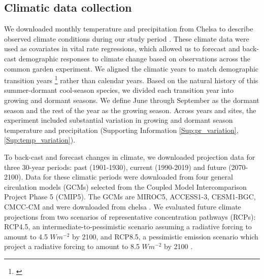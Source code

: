 \documentclass[12pt]{article}
\newcommand{\tom}[2]{{\color{red}{#1}}\footnote{\textit{\color{red}{#2}}}}
\begin{document}
\subsection*{Climatic data collection}
We downloaded monthly temperature and precipitation from Chelsa to describe observed climate conditions during our study period \citep{karger2017climatologies}.
These climate data were used as covariates in vital rate regressions, which allowed us to forecast and back-cast demographic responses to climate change based on observations across the common garden experiment. 
We aligned the climatic years to match demographic transition years \tom{(May 1 -- April 30)}{I am not sure if these are actually the right dates.} rather than calendar years.
Based on the natural history of this summer-dormant cool-season species, we divided each transition year into growing and dormant seasons. 
We define June through September as the dormant season and the rest of the year as the growing season. 
Across years and sites, the experiment included substantial variation in growing and dormant season temperature and precipitation (Supporting Information \ref{Sup:pr_variation}, \ref{Sup:temp_variation}).

To back-cast and forecast changes in climate, we downloaded projection data for three 30-year periods: past (1901-1930), current (1990-2019) and future (2070-2100).
Data for these climatic periods were downloaded from four general circulation models (GCMs) selected from the Coupled Model Intercomparison Project Phase 5 (CMIP5). 
The GCMs are MIROC5, ACCESS1-3, CESM1-BGC, CMCC-CM  and were downloaded from chelsa \citep{sanderson2015representative}.
We evaluated future climate projections from two scenarios of representative concentration pathways (RCPs): RCP4.5, an intermediate-to-pessimistic scenario assuming a radiative forcing to amount to 4.5 $W m^{-2}$ by 2100, and RCP8.5, a pessimistic emission scenario which project a radiative forcing to amount to 8.5 $W m^{-2}$ by 2100 \citep{thomson2011rcp4, schwalm2020rcp8}.
\end{document}
